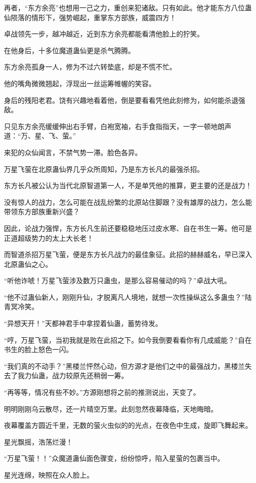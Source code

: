 \begin{this_body}
再者，“东方余亮”也想用一己之力，重创来犯诸敌。只有如此。他才能东方八位蛊仙陨落的情形下，强势崛起，重掌东方部族，威震四方！

卓战领先一步，越冲越近，近到东方余亮都能看清他脸上的狞笑。

在他身后，十多位魔道蛊仙更是杀气腾腾。

东方余亮孤身一人，修为不过六转垫底，却是不慌不忙。

他的嘴角微微翘起，浮现出一丝运筹帷幄的笑容。

身后的残阳老君。饶有兴趣地看着他，倒是要看看凭他此刻修为，如何能杀退强敌。

只见东方余亮缓缓伸出右手臂，白袍宽袖，右手食指指天，一字一顿地朗声道：“万、星、飞、萤。”

来犯的众仙闻言，不禁气势一滞。脸色各异。

万星飞萤在北原蛊仙界几乎众所周知，乃是东方长凡的最强杀招。

东方长凡被公认为当代北原智道第一人，不是单凭他的推算，更主要的还是战力！

没有惊人的战力，怎么可能在战乱纷繁的北原站住脚跟？没有雄厚的战力，怎么能带领东方部族重新兴盛？

因此，论战力强悍，东方长凡生前还要稳稳地压过皮水寒、自在书生一筹。他可是正道超级势力的太上大长老！

而智道杀招万星飞萤，便是东方长凡战力的最佳象征。此招的赫赫威名，早已深入北原蛊仙之心。

“听他诈唬！万星飞萤涉及数万只蛊虫，是那么容易催动的吗？”卓战大吼。

“他不过蛊仙新人，刚刚升仙，才脱离凡人境地，就想一次性操纵这么多蛊虫？”陆青冥冷笑。

“异想天开！”天都神君手中拿捏着仙蛊，蓄势待发。

“哼，万星飞萤，当初我就是败在此招之下。如今我倒要看看你有几成威能？”自在书生的脸上怒色一闪。

“我们真的不动手？”黑楼兰怦然心动，但方源才是他们之中的最强战力，黑楼兰失去了我力仙蛊，战力较原先还稍弱一筹。

“再等等，情况有些不妙。”方源刚想将之前的推测说出，天变了。

明明刚刚乌云散尽，还一片晴空万里。此刻忽然夜幕降临，天地晦暗。

夜幕覆盖方圆近千里，无数的萤火虫似的的光点，在夜色中生成，旋即飞舞起来。

星光飘摇，浩荡烂漫！

“万星飞萤！！”众魔道蛊仙面色骤变，纷纷惊呼，陷入星萤的包裹当中。

星光连绵，映照在众人脸上。


\end{this_body}
